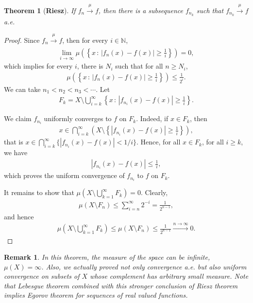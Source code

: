 \documentclass[11pt]{book}
\newtheorem{theorem}{Theorem}[chapter]
\newtheorem{remark}{Remark}[chapter]
\theoremstyle{definition}
\numberwithin{equation}{chapter}
\begin{document}
\begin{theorem}[{\bf Riesz}]\label{theorem_225}
If $f_n \xrightarrow[]{\mu} f$, then there is a subsequence $f_{n_k}$ such that $f_{n_k} \xrightarrow[]{\mu} f$ a.e.
\end{theorem}
\begin{proof}
Since $f_n \xrightarrow[]{\mu} f$, then for every $i \in \mathbb{N}$, 
\begin{align*}
    \lim_{i\to\infty}\mu\left(\left\{x \,:\, \left|f_n(x) - f(x)\right| \geq \frac{1}{i} \right\}\right) = 0,
\end{align*}
which implies for every $i$, there is $N_i$ such that for all $n \geq N_i$,
\begin{align*}
    \mu\left(\left\{x \,:\, \left|f_n(x) - f(x)\right| \geq \frac{1}{i} \right\}\right) \leq \frac{1}{2^i}.
\end{align*}
We can take $n_1 < n_2 < n_3 < \cdots$. Let 
\begin{align*}
    F_k = X \setminus \bigcup^\infty_{i=k} \left\{x \,:\, \left|f_{n_i}(x) - f(x)\right| \geq \frac{1}{i} \right\}.
\end{align*}

We claim $f_{n_i}$ uniformly converges to $f$ on $F_k$. Indeed, if $x \in F_k$, then
\begin{align*}
    x \in \bigcap^\infty_{i=k} \left(X \setminus \left\{\left|f_{n_i}(x) - f(x)\right| \geq \frac{1}{i} \right\}\right),
\end{align*}
that is $x \in \bigcap^\infty_{i=k} \{\left|f_{n_i}(x) - f(x)\right| < 1/i \}$. Hence, for all $x \in F_k$, for all $i \geq k$, we have
\begin{align*}
    \left|f_{n_i}(x) - f(x)\right| \leq \frac{1}{i},
\end{align*}
which proves the uniform convergence of $f_{n_i}$ to $f$ on $F_k$.

It remains to show that $\mu\left(X \setminus \bigcup^\infty_{k=1} F_k \right) = 0$. Clearly, 
\begin{align*}
    \mu(X \setminus F_n) \leq \sum^\infty_{i=n} 2^{-i} = \frac{1}{2^{n-1}},
\end{align*}
and hence
\begin{align*}
    \mu\left(X \setminus \bigcup^\infty_{k=1} F_k \right) \leq \mu(X \setminus F_n) \leq \frac{1}{2^{n-1}} \xrightarrow[]{n \to \infty} 0.
\end{align*}
\end{proof}

\begin{remark}
In this theorem, the measure of the space can be infinite, $\mu(X) = \infty$. Also, we actually proved not only convergence a.e. but also uniform convergence
on subsets of $X$ whose complement has arbitrary small measure. Note that Lebesgue theorem combined with this stronger conclusion of Riesz theorem implies Egorov
theorem for sequences of real valued functions.
\end{remark}
\end{document}
